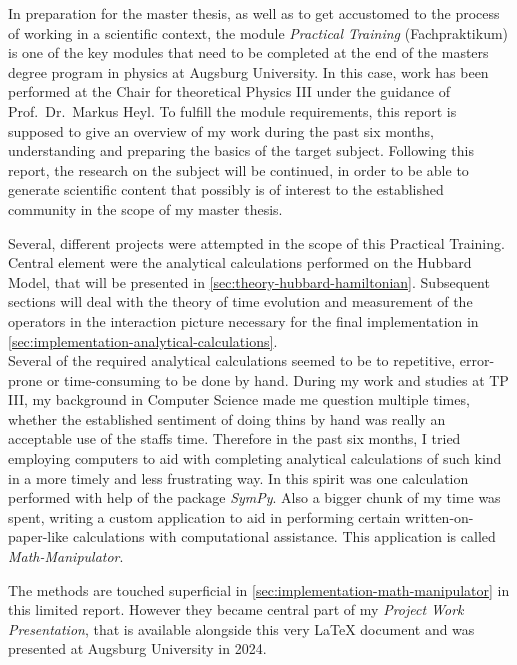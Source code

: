 In preparation for the master thesis, as well as to get accustomed to the process of working in a scientific context, the module \emph{Practical Training} (\glqq Fachpraktikum\grqq{}) is one of the key modules that need to be completed at the end of the masters degree program in physics at Augsburg University.
In this case, work has been performed at the Chair for theoretical Physics III under the guidance of  Prof.~Dr.~Markus Heyl.
To fulfill the module requirements, this report is supposed to give an overview of my work during the past six months, understanding and preparing the basics of the target subject.
Following this report, the research on the subject will be continued, in order to be able to generate scientific content that possibly is of interest to the established community in the scope of my master thesis.

Several, different projects were attempted in the scope of this Practical Training. 
Central element were the analytical calculations performed on the Hubbard Model, that will be presented in \autoref{sec:theory-hubbard-hamiltonian}.
Subsequent sections will deal with the theory of time evolution and measurement of the operators in the interaction picture necessary for the final implementation in \autoref{sec:implementation-analytical-calculations}.\\

Several of the required analytical calculations seemed to be to repetitive, error-prone or time-consuming to be done by hand. 
During my work and studies at TP III, my background in Computer Science made me question multiple times, whether the established sentiment of doing thins \glqq by hand\grqq{} was really an acceptable use of the staffs time.
Therefore in the past six months, I tried employing computers to aid with completing analytical calculations of such kind in a more timely and less frustrating way.
In this spirit was one calculation performed with help of the package \emph{SymPy}.
Also a bigger chunk of my time was spent, writing a custom application to aid in performing certain \glqq written-on-paper-like\grqq{} calculations with computational assistance. This application is called \emph{Math-Manipulator}.

The methods are touched superficial in \autoref{sec:implementation-math-manipulator} in this limited report. 
However they became central part of my \emph{Project Work Presentation}, that is available alongside this very LaTeX document \cite{selfDocument} and was presented at Augsburg University in 2024.